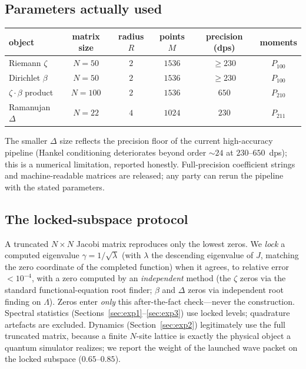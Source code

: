 \documentclass[aps,prx,reprint,floatfix]{revtex4-2}
\begin{document}
\subsection{Parameters actually used}
\begin{center}
\small
\begin{tabular}{lccccc}
\toprule
object & matrix size & radius $R$ & points $M$ & precision (dps) & moments \\
\midrule
Riemann $\zeta$   & $N=50$ & $2$ & $1536$ & $\ge 230$ & $P_{100}$ \\
Dirichlet $\beta$ & $N=50$ & $2$ & $1536$ & $\ge 230$ & $P_{100}$ \\
$\zeta\cdot\beta$ product & $N=100$ & $2$ & $1536$ & $650$ & $P_{210}$ \\
Ramanujan $\Delta$ & $N=22$ & $4$ & $1024$ & $230$ & $P_{211}$ \\
\bottomrule
\end{tabular}
\end{center}
The smaller $\Delta$ size reflects the precision floor of the current
high-accuracy pipeline (Hankel conditioning deteriorates beyond order
$\sim 24$ at $230$--$650$~dps); this is a numerical limitation, reported
honestly. Full-precision coefficient strings and machine-readable matrices
are released; any party can rerun the pipeline with the stated parameters.

\subsection{The locked-subspace protocol}
\label{sec:lock}
A truncated $N\times N$ Jacobi matrix reproduces only the lowest zeros. We
\emph{lock} a computed eigenvalue $\gamma=1/\sqrt{\lambda}$ (with
$\lambda$ the descending eigenvalue of $J$, matching the zero coordinate of
the completed function) when it agrees, to relative error $<10^{-4}$, with a
zero computed by an \emph{independent} method (the $\zeta$ zeros via the
standard functional-equation root finder; $\beta$ and $\Delta$ zeros via
independent root finding on $\Lambda$). Zeros enter \emph{only} this
after-the-fact check---never the construction. Spectral statistics
(Sections~\ref{sec:exp1}--\ref{sec:exp3}) use locked levels; quadrature
artefacts are excluded. Dynamics (Section~\ref{sec:exp2}) legitimately use
the full truncated matrix, because a finite $N$-site lattice is exactly the
physical object a quantum simulator realizes; we report the weight of the
launched wave packet on the locked subspace ($0.65$--$0.85$).
\end{document}
